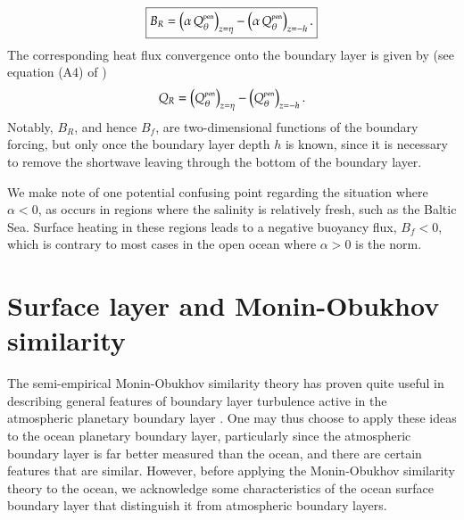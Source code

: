 \begin{equation}
\boxed{
 B_{R} = \left( \alpha \, Q_{\theta}^{\mbox{\tiny pen}} \right)_{z=\eta}
          -\left( \alpha \, Q_{\theta}^{\mbox{\tiny pen}} \right)_{z=-h}.
}
\label{eq:penetrative-buoyancy-kpp}
\end{equation}
The corresponding heat flux convergence onto the boundary layer is
given by (see equation (A4) of \cite{LargeKPP})
\begin{equation}
 Q_{R} = \left(Q_{\theta}^{\mbox{\tiny pen}} \right)_{z=\eta}
          -\left(Q_{\theta}^{\mbox{\tiny pen}} \right)_{z=-h}.
\label{eq:penetrative-heating-kpp}
\end{equation}
Notably, $B_{R}$, and hence $B_{f}$, are two-dimensional functions of
the boundary forcing, but only once the boundary layer depth $h$ is
known, since it is necessary to remove the shortwave leaving through
the bottom of the boundary layer.

We make note of one potential confusing point regarding the situation
where $\alpha < 0$, as occurs in regions where the salinity is
relatively fresh, such as the Baltic Sea.  Surface heating in these
regions leads to a negative buoyancy flux, $B_{f} < 0$, which is
contrary to most cases in the open ocean where $\alpha > 0$ is the
norm.




\section{Surface layer and Monin-Obukhov similarity}
\label{section:m-o-similarity}

The semi-empirical Monin-Obukhov similarity theory has proven quite
useful in describing general features of boundary layer turbulence
active in the atmospheric planetary boundary layer \citep[see, e.g.,
Section 3.3 of][]{KanthaClaysonII}. One may thus choose to apply these
ideas to the ocean planetary boundary layer, particularly since the
atmospheric boundary layer is far better measured than the ocean, and
there are certain features that are similar. However, before applying
the Monin-Obukhov similarity theory to the ocean, we acknowledge some
characteristics of the ocean surface boundary layer that distinguish
it from atmospheric boundary layers.

